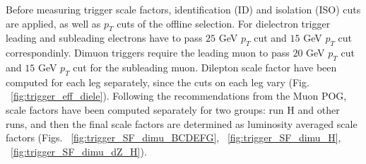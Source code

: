 \begin{table}[b]
\caption{Triggers for dimuon and dielectron analysis channels both at L1 and HLT levels.}

\label{tab:trgs2015}
\begin{center}
\end{center}
\end{table}

Before measuring trigger scale factors, identification (ID) and isolation (ISO) cuts are applied, as well as $p_{T}$ cuts of the offline selection. For dielectron trigger leading and subleading electrons have to pass $25$ GeV $p_{T}$ cut and $15$ GeV $p_{T}$ cut correspondinly. Dimuon triggers require the leading muon to pass $20$ GeV $p_{T}$ cut and $15$ GeV $p_{T}$ cut for the subleading muon. 
Dilepton scale factor have been computed for each leg separately, since the cuts on each leg vary (Fig. ~\ref{fig:trigger_eff_diele}). Following the recommendations from the Muon POG, scale factors have been computed separately for two groups: run H and other runs, and then the final scale factors are determined as luminosity averaged scale factors (Figs. ~\ref{fig:trigger_SF_dimu_BCDEFG}, ~\ref{fig:trigger_SF_dimu_H}, ~\ref{fig:trigger_SF_dimu_dZ_H}). 

